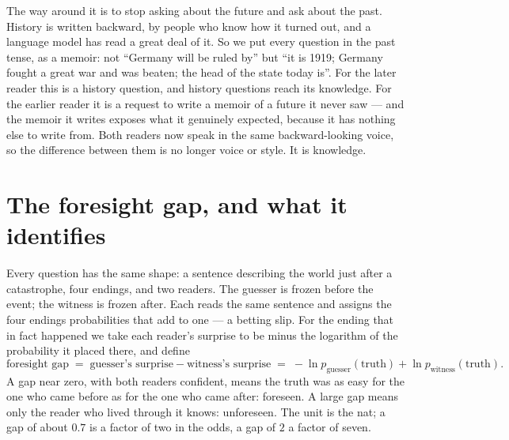 \documentclass[11pt]{article}
\begin{document}
The way around it is to stop asking about the future and ask about the past. History is written backward,
by people who know how it turned out, and a language model has read a great deal of it. So we put every
question in the past tense, as a memoir: not ``Germany will be ruled by'' but ``it is 1919; Germany fought
a great war and was beaten; the head of the state today is''. For the later reader this is a history
question, and history questions reach its knowledge. For the earlier reader it is a request to write a
memoir of a future it never saw --- and the memoir it writes exposes what it genuinely expected, because it
has nothing else to write from. Both readers now speak in the same backward-looking voice, so the
difference between them is no longer voice or style. It is knowledge.

\section{The foresight gap, and what it identifies}\label{sec:gap}

Every question has the same shape: a sentence describing the world just after a catastrophe, four endings,
and two readers. The guesser is frozen before the event; the witness is frozen after. Each reads the same
sentence and assigns the four endings probabilities that add to one --- a betting slip. For the ending that
in fact happened we take each reader's surprise to be minus the logarithm of the probability it placed
there, and define
\[
\text{foresight gap} \;=\; \text{guesser's surprise} - \text{witness's surprise}
\;=\; -\ln p_{\text{guesser}}(\text{truth}) + \ln p_{\text{witness}}(\text{truth}).
\]
A gap near zero, with both readers confident, means the truth was as easy for the one who came before as
for the one who came after: foreseen. A large gap means only the reader who lived through it knows:
unforeseen. The unit is the nat; a gap of about $0.7$ is a factor of two in the odds, a gap of $2$ a factor
of seven.
\end{document}
